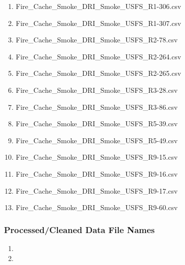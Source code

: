\begin{enumerate}
\item Fire\_Cache\_Smoke\_DRI\_Smoke\_USFS\_R1-306.csv
\item Fire\_Cache\_Smoke\_DRI\_Smoke\_USFS\_R1-307.csv
\item Fire\_Cache\_Smoke\_DRI\_Smoke\_USFS\_R2-78.csv
\item Fire\_Cache\_Smoke\_DRI\_Smoke\_USFS\_R2-264.csv
\item Fire\_Cache\_Smoke\_DRI\_Smoke\_USFS\_R2-265.csv
\item Fire\_Cache\_Smoke\_DRI\_Smoke\_USFS\_R3-28.csv
\item Fire\_Cache\_Smoke\_DRI\_Smoke\_USFS\_R3-86.csv
\item Fire\_Cache\_Smoke\_DRI\_Smoke\_USFS\_R5-39.csv
\item Fire\_Cache\_Smoke\_DRI\_Smoke\_USFS\_R5-49.csv
\item Fire\_Cache\_Smoke\_DRI\_Smoke\_USFS\_R9-15.csv
\item Fire\_Cache\_Smoke\_DRI\_Smoke\_USFS\_R9-16.csv
\item Fire\_Cache\_Smoke\_DRI\_Smoke\_USFS\_R9-17.csv
\item Fire\_Cache\_Smoke\_DRI\_Smoke\_USFS\_R9-60.csv

\end{enumerate}

\subsubsection*{Processed/Cleaned Data File Names}

\begin{enumerate}
\item 
\item
\end{enumerate}

